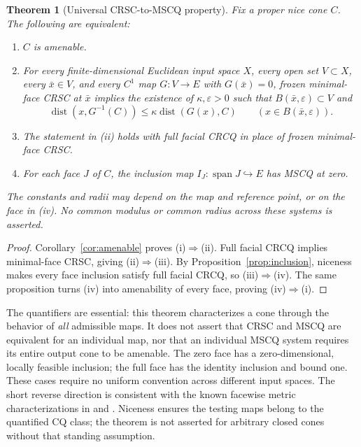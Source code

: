 \documentclass[11pt]{article}
\numberwithin{equation}{section}
\newtheorem{theorem}{Theorem}[section]
\theoremstyle{definition}
\theoremstyle{remark}
\DeclareMathOperator{\dist}{dist}
\DeclareMathOperator{\spann}{span}
\newcommand{\xb}{\bar x}
\newcommand{\dset}[2]{\dist(#1,#2)}
\begin{document}
\begin{theorem}[Universal CRSC-to-MSCQ property]
\label{thm:universal}
Fix a proper nice cone $C$. The following are equivalent:
\begin{enumerate}[label=(\roman*)]
 \item $C$ is amenable.
 \item For every finite-dimensional Euclidean input space $X$, every open
 set $V\subset X$, every $\xb\in V$, and every $C^1$ map $G:V\to E$
 with $G(\xb)=0$, frozen minimal-face CRSC at $\xb$ implies the existence
 of $\kappa,\varepsilon>0$ such that $B(\xb,\varepsilon)\subset V$ and
 \[
 \dset{x}{G^{-1}(C)}\leq\kappa\dset{G(x)}{C}
 \qquad(x\in B(\xb,\varepsilon)).
 \]
 \item The statement in (ii) holds with full facial CRCQ in place of
 frozen minimal-face CRSC.
 \item For each face $J$ of $C$, the inclusion map
 $I_J:\spann J\hookrightarrow E$ has MSCQ at zero.
\end{enumerate}
The constants and radii may depend on the map and reference point, or on
the face in (iv). No common modulus or common radius across these
systems is asserted.
\end{theorem}
\begin{proof}
Corollary~\ref{cor:amenable} proves (i)$\Rightarrow$(ii).
Full facial CRCQ implies minimal-face CRSC, giving
(ii)$\Rightarrow$(iii). By Proposition~\ref{prop:inclusion}, niceness
makes every face inclusion satisfy full facial CRCQ, so
(iii)$\Rightarrow$(iv). The same proposition turns (iv) into amenability
of every face, proving (iv)$\Rightarrow$(i).
\end{proof}

The quantifiers are essential: this theorem characterizes a cone through
the behavior of \emph{all} admissible maps. It does not assert that
CRSC and MSCQ are equivalent for an individual map, nor that an
individual MSCQ system requires its entire output cone to be amenable.
The zero face has a zero-dimensional, locally feasible inclusion; the
full face has the identity inclusion and bound one. These cases require
no uniform convention across different input spaces. The short reverse
direction is consistent with the known facewise metric characterizations
in \citet[Proposition~12]{lourencoAmenable} and
\citet[Proposition~3.2]{lrs2022}. Niceness ensures the testing maps belong
to the quantified CQ class; the theorem is not asserted for arbitrary
closed cones without that standing assumption.
\end{document}
